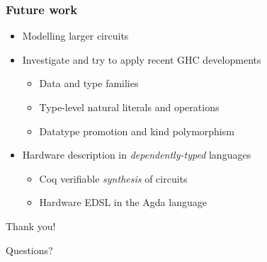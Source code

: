     \begin{frame}
        \frametitle{Future work}

        \begin{itemize}
            \item Modelling larger circuits
            \vspace{0.2cm}
            \item Investigate and try to apply recent GHC developments
                \begin{itemize}
                    \item Data and type families
                    \item Type-level natural literals and operations
                    \item Datatype promotion and kind polymorphism
                \end{itemize}
            \vspace{0.2cm}
            \item Hardware description in \emph{dependently-typed} languages
                \begin{itemize}
                    \item Coq verifiable \emph{synthesis} of circuits
                    \item Hardware EDSL in the Agda language
                \end{itemize}
        \end{itemize}

    \end{frame}


    \begin{frame}[plain]
        \begin{center}
            \par{\Huge{Thank you!}}
            \vspace{2.0cm}
            \par{\Huge{Questions?}}
        \end{center}
    \end{frame}
